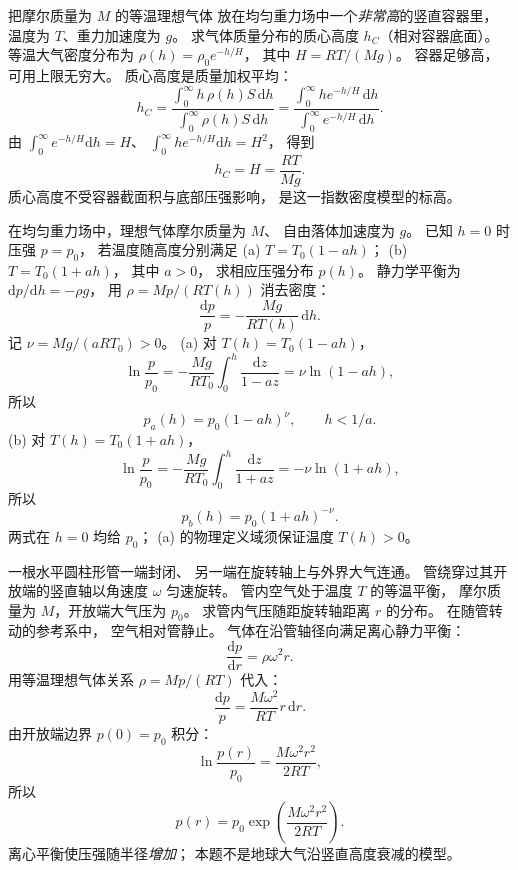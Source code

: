 把摩尔质量为 $M$ 的等温理想气体
放在均匀重力场中一个\emph{非常高}的竖直容器里，
温度为 $T$、重力加速度为 $g$。
求气体质量分布的质心高度
$h_C$（相对容器底面）。
\exsolution
等温大气密度分布为
$\rho(h)=\rho_0e^{-h/H}$，
其中 $H=RT/(Mg)$。
容器足够高，可用上限无穷大。
质心高度是质量加权平均：
\[
h_C=\frac{\int_0^\infty h\,\rho(h)S\,\mathrm dh}
{\int_0^\infty\rho(h)S\,\mathrm dh}
=\frac{\int_0^\infty h e^{-h/H}\,\mathrm dh}
{\int_0^\infty e^{-h/H}\,\mathrm dh}.
\]
由
$\int_0^\infty e^{-h/H}\mathrm dh=H$、
$\int_0^\infty h e^{-h/H}\mathrm dh=H^2$，
得到
\[
\boxed{h_C=H=\frac{RT}{Mg}}.
\]
\excheck 质心高度不受容器截面积与底部压强影响，
是这一指数密度模型的标高。

在均匀重力场中，理想气体摩尔质量为 $M$、
自由落体加速度为 $g$。
已知 $h=0$ 时压强 $p=p_0$，
若温度随高度分别满足
(a) $T=T_0(1-ah)$；
(b) $T=T_0(1+ah)$，
其中 $a>0$，
求相应压强分布 $p(h)$。
\exsolution
静力学平衡为
$\mathrm dp/\mathrm dh=-\rho g$，
用
$\rho=Mp/(RT(h))$ 消去密度：
\[
\frac{\mathrm dp}{p}
=-\frac{Mg}{RT(h)}\,\mathrm dh.
\]
记
$\nu=Mg/(aRT_0)>0$。
(a) 对 $T(h)=T_0(1-ah)$，
\[
\ln\frac p{p_0}
=-\frac{Mg}{RT_0}\int_0^h\frac{\mathrm dz}{1-az}
=\nu\ln(1-ah),
\]
所以
\[
\boxed{p_a(h)=p_0(1-ah)^\nu},
\qquad h<1/a.
\]
(b) 对 $T(h)=T_0(1+ah)$，
\[
\ln\frac p{p_0}
=-\frac{Mg}{RT_0}\int_0^h\frac{\mathrm dz}{1+az}
=-\nu\ln(1+ah),
\]
所以
\[
\boxed{p_b(h)=p_0(1+ah)^{-\nu}}.
\]
\excheck 两式在 $h=0$ 均给 $p_0$；
(a) 的物理定义域须保证温度 $T(h)>0$。

一根水平圆柱形管一端封闭、
另一端在旋转轴上与外界大气连通。
管绕穿过其开放端的竖直轴以角速度
$\omega$ 匀速旋转。
管内空气处于温度 $T$ 的等温平衡，
摩尔质量为 $M$，开放端大气压为 $p_0$。
求管内气压随距旋转轴距离 $r$ 的分布。
\exsolution
在随管转动的参考系中，
空气相对管静止。
气体在沿管轴径向满足离心静力平衡：
\[
\frac{\mathrm dp}{\mathrm dr}=\rho\omega^2r.
\]
用等温理想气体关系
$\rho=Mp/(RT)$ 代入：
\[
\frac{\mathrm dp}{p}
=\frac{M\omega^2}{RT}r\,\mathrm dr.
\]
由开放端边界 $p(0)=p_0$ 积分：
\[
\ln\frac{p(r)}{p_0}
=\frac{M\omega^2r^2}{2RT},
\]
所以
\[
\boxed{p(r)=p_0
\exp\left(\frac{M\omega^2r^2}{2RT}\right)}.
\]
\excheck 离心平衡使压强随半径\emph{增加}；
本题不是地球大气沿竖直高度衰减的模型。

